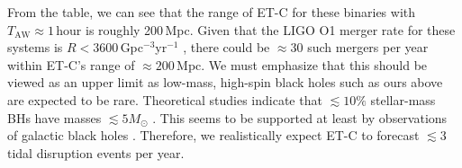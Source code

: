 \documentclass[prd,amsmath,amssymb,aps,floats,amsfonts,notitlepage,superscriptaddress,eqsecnum,nofootinbib,10pt]{revtex4-1}
\newcommand{\f}{\frac}
\newcommand{\be}{\begin{equation}}
\newcommand{\ee}{\end{equation}}
\begin{document}
From the table, we can see that the range of ET-C for these binaries with $T_\text{AW} \approx 1\,$hour is roughly 200\,Mpc.
Given that the LIGO O1 merger rate for these systems is $ R < 3600\,$Gpc$^{-3}$yr$^{-1}$ \cite{Abbott:2016ymx},
there could be $\approx 30$ such mergers per year within ET-C's range of $\approx 200\,$Mpc. %
We must emphasize that this should be viewed
as an upper limit as low-mass, high-spin black holes such as ours above are expected to be rare.
Theoretical studies indicate that $\lesssim 10\%$ stellar-mass BHs have masses $\lesssim 5 M_\odot$ \cite{Fryer:1999ht}.
This seems to be supported at least by observations of galactic black holes \cite{Ozel:2010su}.
Therefore, we realistically expect ET-C to forecast $\lesssim 3$ tidal disruption events per year.
%
\end{document}
